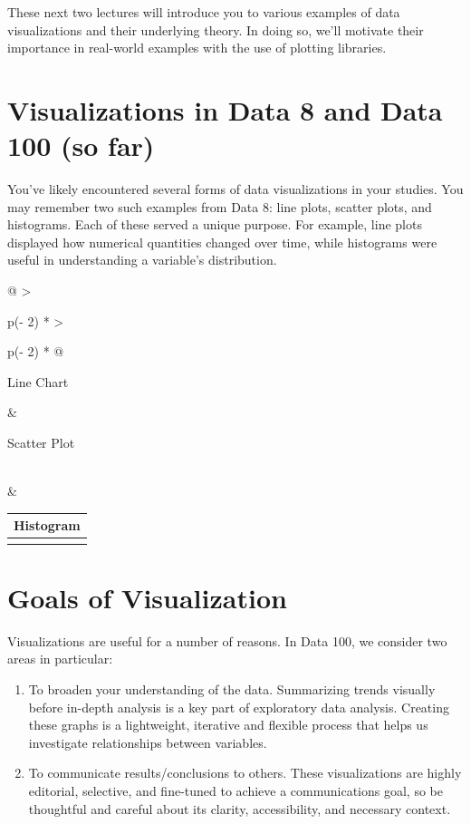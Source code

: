\documentclass[
  letterpaper,
  DIV=11,
  numbers=noendperiod]{scrreprt}
\providecommand{\tightlist}{%
  \setlength{\itemsep}{0pt}\setlength{\parskip}{0pt}}\usepackage{longtable,booktabs,array}
\begin{document}
These next two lectures will introduce you to various examples of data
visualizations and their underlying theory. In doing so, we'll motivate
their importance in real-world examples with the use of plotting
libraries.

\section{Visualizations in Data 8 and Data 100 (so
far)}\label{visualizations-in-data-8-and-data-100-so-far}

You've likely encountered several forms of data visualizations in your
studies. You may remember two such examples from Data 8: line plots,
scatter plots, and histograms. Each of these served a unique purpose.
For example, line plots displayed how numerical quantities changed over
time, while histograms were useful in understanding a variable's
distribution.

\begin{longtable}[]{@{}
  >{\raggedright\arraybackslash}p{(\columnwidth - 2\tabcolsep) * }
  >{\raggedright\arraybackslash}p{(\columnwidth - 2\tabcolsep) * }@{}}
\toprule\noalign{}
\begin{minipage}[b]{\linewidth}\raggedright
Line Chart
\end{minipage} & \begin{minipage}[b]{\linewidth}\raggedright
Scatter Plot
\end{minipage} \\
\midrule\noalign{}
\endhead
\bottomrule\noalign{}
\endlastfoot
& \\
\end{longtable}

\begin{longtable}[]{@{}l@{}}
\toprule\noalign{}
Histogram \\
\midrule\noalign{}
\endhead
\bottomrule\noalign{}
\endlastfoot
 \\
\end{longtable}

\section{Goals of Visualization}\label{goals-of-visualization}

Visualizations are useful for a number of reasons. In Data 100, we
consider two areas in particular:

\begin{enumerate}
\def\labelenumi{\arabic{enumi}.}
\tightlist
\item
  To broaden your understanding of the data. Summarizing trends visually
  before in-depth analysis is a key part of exploratory data analysis.
  Creating these graphs is a lightweight, iterative and flexible process
  that helps us investigate relationships between variables.
\item
  To communicate results/conclusions to others. These visualizations are
  highly editorial, selective, and fine-tuned to achieve a
  communications goal, so be thoughtful and careful about its clarity,
  accessibility, and necessary context.
\end{enumerate}
\end{document}
